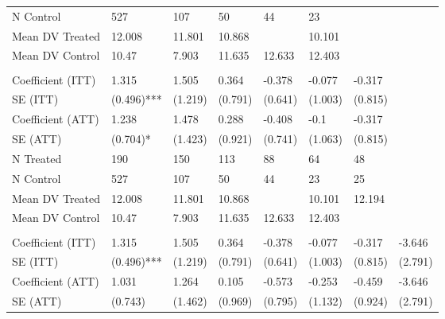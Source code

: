 \begin{table}[!h]
\begin{threeparttable}
\begin{tabular}[t]{llllllll}
\hspace{1em}N Control & 527 & 107 & 50 & 44 & 23 &  & \\
\hspace{1em}Mean DV Treated & 12.008 & 11.801 & 10.868 &  & 10.101 &  & \\
\hspace{1em}Mean DV Control & 10.47 & 7.903 & 11.635 & 12.633 & 12.403 &  \vphantom{1} & \\
\addlinespace[0.3em]
\multicolumn{8}{l}{\textbf{Panel C: t* = 6}}\\
\hspace{1em}Coefficient (ITT) & 1.315 & 1.505 & 0.364 & -0.378 & -0.077 & -0.317 & \\
\hspace{1em}SE (ITT) & (0.496)*** & (1.219) & (0.791) & (0.641) & (1.003) & (0.815) & \\
\hspace{1em}Coefficient (ATT) & 1.238 & 1.478 & 0.288 & -0.408 & -0.1 & -0.317 & \\
\hspace{1em}SE (ATT) & (0.704)* & (1.423) & (0.921) & (0.741) & (1.063) & (0.815) & \\
\hspace{1em}N Treated & 190 & 150 & 113 & 88 & 64 & 48 & \\
\hspace{1em}N Control & 527 & 107 & 50 & 44 & 23 & 25 & \\
\hspace{1em}Mean DV Treated & 12.008 & 11.801 & 10.868 &  & 10.101 & 12.194 \vphantom{1} & \\
\hspace{1em}Mean DV Control & 10.47 & 7.903 & 11.635 & 12.633 & 12.403 &  & \\
\addlinespace[0.3em]
\multicolumn{8}{l}{\textbf{Panel D: t* = 7}}\\
\hspace{1em}Coefficient (ITT) & 1.315 & 1.505 & 0.364 & -0.378 & -0.077 & -0.317 & -3.646\\
\hspace{1em}SE (ITT) & (0.496)*** & (1.219) & (0.791) & (0.641) & (1.003) & (0.815) & (2.791)\\
\hspace{1em}Coefficient (ATT) & 1.031 & 1.264 & 0.105 & -0.573 & -0.253 & -0.459 & -3.646\\
\hspace{1em}SE (ATT) & (0.743) & (1.462) & (0.969) & (0.795) & (1.132) & (0.924) & (2.791)\\

\end{tabular}
\end{threeparttable}
\end{table}
